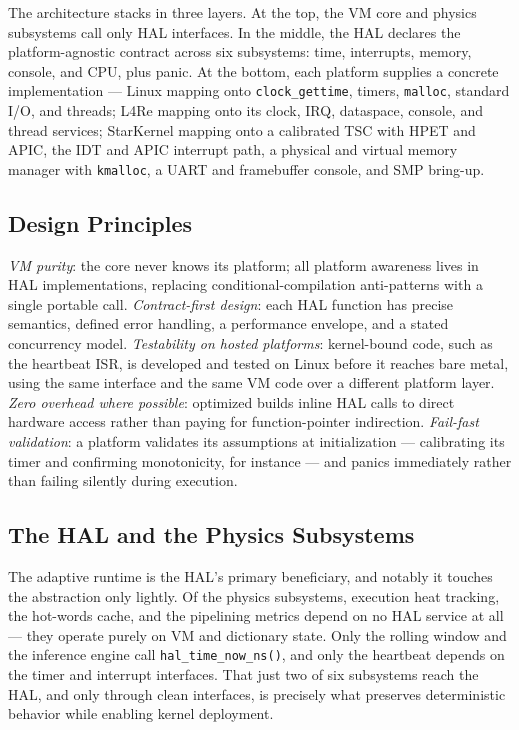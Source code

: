 The architecture stacks in three layers. At the top, the VM core and physics
subsystems call only HAL interfaces. In the middle, the HAL declares the
platform-agnostic contract across six subsystems: time, interrupts, memory,
console, and CPU, plus panic. At the bottom, each platform supplies a concrete
implementation --- Linux mapping onto \texttt{clock\_gettime}, timers,
\texttt{malloc}, standard I/O, and threads; L4Re mapping onto its clock, IRQ,
dataspace, console, and thread services; StarKernel mapping onto a calibrated
TSC with HPET and APIC, the IDT and APIC interrupt path, a physical and virtual
memory manager with \texttt{kmalloc}, a UART and framebuffer console, and SMP
bring-up.

\subsection{Design Principles}

\emph{VM purity}: the core never knows its platform; all platform awareness
lives in HAL implementations, replacing conditional-compilation anti-patterns
with a single portable call. \emph{Contract-first design}: each HAL function has
precise semantics, defined error handling, a performance envelope, and a stated
concurrency model. \emph{Testability on hosted platforms}: kernel-bound code,
such as the heartbeat ISR, is developed and tested on Linux before it reaches
bare metal, using the same interface and the same VM code over a different
platform layer. \emph{Zero overhead where possible}: optimized builds inline HAL
calls to direct hardware access rather than paying for function-pointer
indirection. \emph{Fail-fast validation}: a platform validates its assumptions
at initialization --- calibrating its timer and confirming monotonicity, for
instance --- and panics immediately rather than failing silently during
execution.

\subsection{The HAL and the Physics Subsystems}

The adaptive runtime is the HAL's primary beneficiary, and notably it touches
the abstraction only lightly. Of the physics subsystems, execution heat
tracking, the hot-words cache, and the pipelining metrics depend on no HAL
service at all --- they operate purely on VM and dictionary state. Only the
rolling window and the inference engine call \texttt{hal\_time\_now\_ns()}, and
only the heartbeat depends on the timer and interrupt interfaces. That just two
of six subsystems reach the HAL, and only through clean interfaces, is precisely
what preserves deterministic behavior while enabling kernel deployment.

